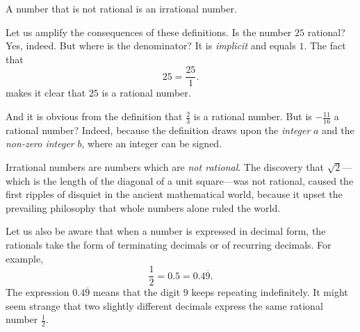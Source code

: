 \documentclass[
  a4paper,
]{article}
\begin{document}
A number that is not rational is an irrational number.

Let us amplify the consequences of these definitions. Is the number
\(25\) rational? Yes, indeed. But where is the denominator? It is
\emph{implicit} and equals \(1\). The fact that \[
25 = \frac{25}{1}.
\] makes it clear that \(25\) is a rational number.

And it is obvious from the definition that \(\frac{2}{3}\) is a rational
number. But is \(-\frac{11}{16}\) a rational number? Indeed, because the
definition draws upon the \emph{integer} \(a\) and the \emph{non-zero
integer} \(b\), where an integer can be signed.

Irrational numbers are numbers which are \emph{not rational}. The
discovery that \(\sqrt{2}\)---which is the length of the diagonal of a
unit square---was not rational, caused the first ripples of disquiet in
the ancient mathematical world, because it upset the prevailing
philosophy that whole numbers alone ruled the world.

Let us also be aware that when a number is expressed in decimal form,
the rationals take the form of terminating decimals or of recurring
decimals. For example, \[
\frac{1}{2} = 0.5 = 0.4\overline{9}.
\] The expression \(0.4\overline{9}\) means that the digit \(9\) keeps
repeating indefinitely. It might seem strange that two slightly
different decimals express the same rational number \(\frac{1}{2}\).
\end{document}
